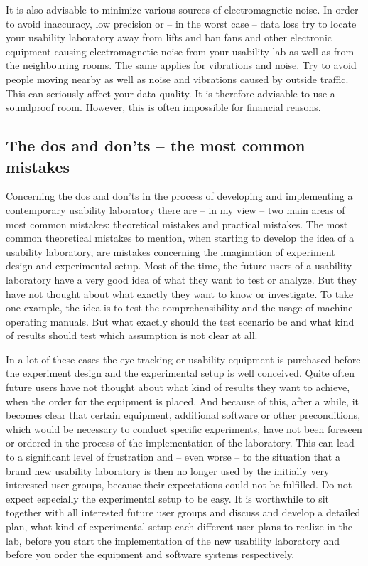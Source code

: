 \documentclass[output=paper]{langsci/langscibook}
\begin{document}
It is also advisable to minimize various sources of electromagnetic noise. In order to avoid inaccuracy, low precision or -- in the worst case -- data loss try to locate your usability laboratory away from lifts and ban fans and other electronic equipment causing electromagnetic noise from your usability lab as well as from the neighbouring rooms. The same applies for vibrations and noise. Try to avoid people moving nearby as well as noise and vibrations caused by outside traffic. This can seriously affect your data quality. It is therefore advisable to use a soundproof room. However, this is often impossible for financial reasons.


\subsection{The dos and don'ts -- the most common mistakes }

Concerning the dos and don'ts in the process of developing and implementing a contemporary usability laboratory there are -- in my view -- two main areas of most common mistakes: theoretical mistakes and practical mistakes. The most common theoretical mistakes to mention, when starting to develop the idea of a usability laboratory, are mistakes concerning the imagination of experiment design and experimental setup. Most of the time, the future users of a usability laboratory have a very good idea of what they want to test or analyze. But they have not thought about what exactly they want to know or investigate. To take one example, the idea is to test the comprehensibility and the usage of machine operating manuals. But what exactly should the test scenario be and what kind of results should test which assumption is not clear at all. 


In a lot of these cases the eye tracking or usability equipment is purchased before the experiment design and the experimental setup is well conceived. Quite often future users have not thought about what kind of results they want to achieve, when the order for the equipment is placed. And because of this, after a while, it becomes clear that certain equipment, additional software or other preconditions, which would be necessary to conduct specific experiments, have not been foreseen or ordered in the process of the implementation of the laboratory. This can lead to a significant level of frustration and -- even worse -- to the situation that a brand new usability laboratory is then no longer used by the initially very interested user groups, because their expectations could not be fulfilled. Do not expect especially the experimental setup to be easy. It is worthwhile to sit together with all interested future user groups and discuss and develop a detailed plan, what kind of experimental setup each different user plans to realize in the lab, before you start the implementation of the new usability laboratory and before you order the equipment and software systems respectively.
\end{document}
